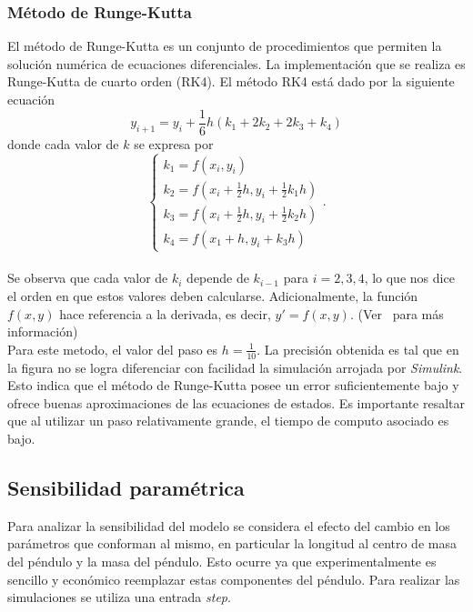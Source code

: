 \documentclass[journal]{IEEEtran}
\begin{document}
\subsubsection*{Método de Runge-Kutta}
El método de Runge-Kutta es un conjunto de procedimientos que permiten la solución numérica de ecuaciones diferenciales. La implementación que se realiza es Runge-Kutta de cuarto orden (RK4). El método RK4 está dado por la siguiente ecuación \[ y_{i + 1} = y_i + \frac{1}{6} h (k_1 + 2 k_2 + 2 k_3 + k_4) \] donde cada valor de $k$ se expresa por
\[
  \begin{cases}
    k_1 = f(x_i, y_i)\\
    k_2 = f(x_i + \frac{1}{2} h, y_i + \frac{1}{2} k_1 h)\\
    k_3 = f(x_i + \frac{1}{2} h, y_i + \frac{1}{2} k_2 h)\\
    k_4 = f(x_1 + h, y_i + k_3 h)
  \end{cases}.
\]
\\
Se observa que cada valor de $k_i$ depende de $k_{i - 1}$ para $i = 2, 3, 4$, lo que nos dice el orden en que estos valores deben calcularse. Adicionalmente, la función $f(x, y)$ hace referencia a la derivada, es decir, $y' = f(x, y)$. (Ver~\cite{hamm} para más información)\\

Para este metodo, el valor del paso es $h = \frac{1}{10}$. La precisión obtenida es tal que en la figura no se logra diferenciar con facilidad la simulación arrojada por \textit{Simulink}.
Esto indica que el método de Runge-Kutta posee un error
suficientemente bajo y ofrece buenas aproximaciones de las ecuaciones de estados. Es importante resaltar que al utilizar un paso relativamente grande,
el tiempo de computo asociado es bajo.\\

\subsection{Sensibilidad paramétrica}
Para analizar la sensibilidad del modelo se considera el efecto del cambio en los parámetros que conforman al mismo, en particular la longitud al centro de masa del péndulo y la masa del péndulo.
Esto ocurre ya que experimentalmente es sencillo y económico reemplazar estas componentes del péndulo. Para realizar las simulaciones se utiliza una entrada \textit{step}.\\
\end{document}
